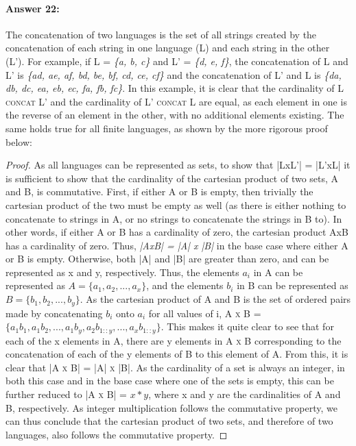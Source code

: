 \documentclass[10pt]{article}
\begin{document}
\paragraph{Answer 22:} The concatenation of two languages is the set of all strings created by the concatenation of each string in one language (L) and each string in the other (L'). For example, if L = \textit{\{a, b, c\}} and L' = \textit{\{d, e, f\}}, the concatenation of L and L' is \textit{\{ad, ae, af, bd, be, bf, cd, ce, cf\}} and the concatenation of L' and L is \textit{\{da, db, dc, ea, eb, ec, fa, fb, fc\}}. In this example, it is clear that the cardinality of \textsc{L concat L'} and the cardinality of \textsc{L' concat L} are equal, as each element in one is the reverse of an element in the other, with no additional elements existing. The same holds true for all finite languages, as shown by the more rigorous proof below: 

\begin{proof}
As all languages can be represented as sets, to show that |LxL'| = |L'xL| it is sufficient to show that the cardinality of the cartesian product of two sets, A and B, is commutative. First, if either A or B is empty, then trivially the cartesian product of the two must be empty as well (as there is either nothing to concatenate to strings in A, or no strings to concatenate the strings in B to). In other words, if either A or B has a cardinality of zero, the cartesian product AxB has a cardinality of zero. Thus, \textit{|AxB| = |A| x |B|} in the base case where either A or B is empty. Otherwise, both |A| and |B| are greater than zero, and can be represented as x and y, respectively. Thus, the elements $a_i$ in A can be represented as $A = \{a_1, a_2, ..., a_x\}$, and the elements $b_i$ in B can be represented as $B = \{b_1, b_2, ..., b_y\}$. As the cartesian product of A and B is the set of ordered pairs made by concatenating $b_i$ onto $a_i$ for all values of i, \textsc{A x B} = $\{a_1b_1, a_1b_2, ..., a_1b_y, a_2b_{1::y}, ..., a_xb_{1::y}\}$. This makes it quite clear to see that for each of the x elements in A, there are y elements in \textsc{A x B} corresponding to the concatenation of each of the y elements of B to this element of A. From this, it is clear that \textsc{|A x B|} = \textsc{|A| x |B|}. As the cardinality of a set is always an integer, in both this case and in the base case where one of the sets is empty, this can be further reduced to \textsc{|A x B|} = $x*y$, where x and y are the cardinalities of A and B, respectively. As integer multiplication follows the commutative property, we can thus conclude that the cartesian product of two sets, and therefore of two languages, also follows the commutative property.
\end{proof}
\end{document}
